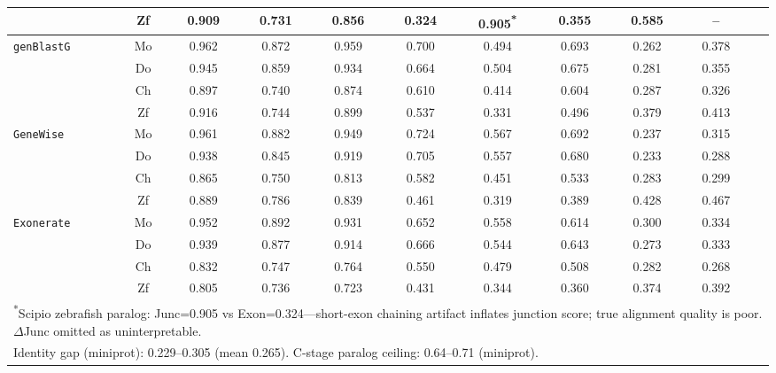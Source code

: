 \begin{table}[t]
{\begin{tabular}{lcccccccccc}
 & Zf & 0.909 & 0.731 & 0.856 & 0.324 & 0.905\textsuperscript{*} & 0.355 & 0.585 & -- \\
\midrule
\texttt{genBlastG} & Mo & 0.962 & 0.872 & 0.959 & 0.700 & 0.494 & 0.693 & 0.262 & 0.378 \\
 & Do & 0.945 & 0.859 & 0.934 & 0.664 & 0.504 & 0.675 & 0.281 & 0.355 \\
 & Ch & 0.897 & 0.740 & 0.874 & 0.610 & 0.414 & 0.604 & 0.287 & 0.326 \\
 & Zf & 0.916 & 0.744 & 0.899 & 0.537 & 0.331 & 0.496 & 0.379 & 0.413 \\
\midrule
\texttt{GeneWise} & Mo & 0.961 & 0.882 & 0.949 & 0.724 & 0.567 & 0.692 & 0.237 & 0.315 \\
 & Do & 0.938 & 0.845 & 0.919 & 0.705 & 0.557 & 0.680 & 0.233 & 0.288 \\
 & Ch & 0.865 & 0.750 & 0.813 & 0.582 & 0.451 & 0.533 & 0.283 & 0.299 \\
 & Zf & 0.889 & 0.786 & 0.839 & 0.461 & 0.319 & 0.389 & 0.428 & 0.467 \\
\midrule
\texttt{Exonerate} & Mo & 0.952 & 0.892 & 0.931 & 0.652 & 0.558 & 0.614 & 0.300 & 0.334 \\
 & Do & 0.939 & 0.877 & 0.914 & 0.666 & 0.544 & 0.643 & 0.273 & 0.333 \\
 & Ch & 0.832 & 0.747 & 0.764 & 0.550 & 0.479 & 0.508 & 0.282 & 0.268 \\
 & Zf & 0.805 & 0.736 & 0.723 & 0.431 & 0.344 & 0.360 & 0.374 & 0.392 \\
\bottomrule
\multicolumn{11}{l}{\textsuperscript{*}Scipio zebrafish paralog: Junc=0.905 vs Exon=0.324---short-exon chaining artifact inflates junction score; true alignment quality is poor. $\Delta$Junc omitted as uninterpretable.} \\
\multicolumn{11}{l}{Identity gap (miniprot): 0.229--0.305 (mean 0.265). C-stage paralog ceiling: 0.64--0.71 (miniprot).} \\
\end{tabular}
}
\end{table}
